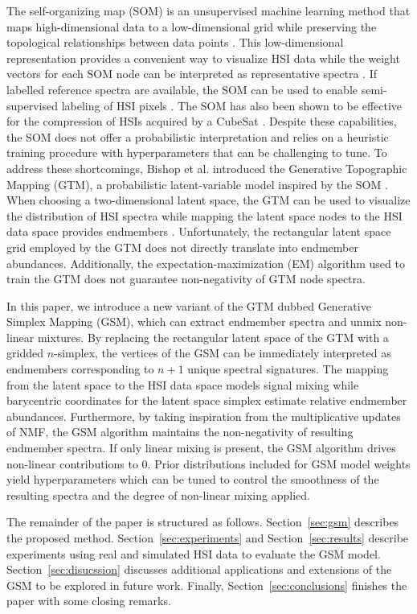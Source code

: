 \documentclass[remotesensing,article,submit,pdftex,moreauthors]{Definitions/mdpi}
\begin{document}
The self-organizing map (SOM) is an unsupervised machine learning method that maps high-dimensional data to a low-dimensional grid while preserving the topological relationships between data points \cite{kohonen-som-1}. This low-dimensional representation provides a convenient way to visualize HSI data while the weight vectors for each SOM node can be interpreted as representative spectra \cite{cantero2004analysis, duran2007time,som-hsi}. If labelled reference spectra are available, the SOM can be used to enable semi-supervised labeling of HSI pixels \cite{riese2019supervised}. The SOM has also been shown to be effective for the compression of HSIs acquired by a CubeSat \cite{som-satellite}. Despite these capabilities, the SOM does not offer a probabilistic interpretation and relies on a heuristic training procedure with hyperparameters that can be challenging to tune. To address these shortcomings, Bishop et al. introduced the Generative Topographic Mapping (GTM), a probabilistic latent-variable model inspired by the SOM \cite{gtm-orig}. When choosing a two-dimensional latent space, the GTM can be used to visualize the distribution of HSI spectra while mapping the latent space nodes to the HSI data space provides endmembers \cite{robot-team-gtm}. Unfortunately, the rectangular latent space grid employed by the GTM does not directly translate into endmember abundances. Additionally, the expectation-maximization (EM) algorithm used to train the GTM does not guarantee non-negativity of GTM node spectra. 

In this paper, we introduce a new variant of the GTM dubbed Generative Simplex Mapping (GSM), which can extract endmember spectra and unmix non-linear mixtures. By replacing the rectangular latent space of the GTM with a gridded $n$-simplex, the vertices of the GSM can be immediately interpreted as endmembers corresponding to $n+1$ unique spectral signatures. The mapping from the latent space to the HSI data space models signal mixing while barycentric coordinates for the latent space simplex estimate relative endmember abundances. Furthermore, by taking inspiration from the multiplicative updates of NMF, the GSM algorithm maintains the non-negativity of resulting endmember spectra. If only linear mixing is present, the GSM algorithm drives non-linear contributions to $0$. Prior distributions included for GSM model weights yield hyperparameters which can be tuned to control the smoothness of the resulting spectra and the degree of non-linear mixing applied.

The remainder of the paper is structured as follows. Section~\ref{sec:gsm} describes the proposed method. Section~\ref{sec:experiments} and Section~\ref{sec:results} describe experiments using real and simulated HSI data to evaluate the GSM model. Section~\ref{sec:disucssion} discusses additional applications and extensions of the GSM to be explored in future work. Finally, Section~\ref{sec:conclusions} finishes the paper with some closing remarks.
\end{document}
